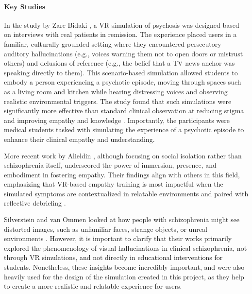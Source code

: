 \paragraph{Key Studies}

In the study by Zare-Bidaki \cite{Zare-Bidaki2022}, a VR simulation of psychosis was designed based on interviews with real patients in remission. The experience placed users in a familiar, culturally grounded setting where they encountered persecutory auditory hallucinations (e.g., voices warning them not to open doors or mistrust others) and delusions of reference (e.g., the belief that a TV news anchor was speaking directly to them). This scenario-based simulation allowed students to embody a person experiencing a psychotic episode, moving through spaces such as a living room and kitchen while hearing distressing voices and observing realistic environmental triggers. The study found that such simulations were significantly more effective than standard clinical observation at reducing stigma and improving empathy and knowledge \cite{Zare-Bidaki2022}. Importantly, the participants were medical students tasked with simulating the experience of a psychotic episode to enhance their clinical empathy and understanding.

\vspace{1em}

More recent work by Alieldin \cite{Alieldin2024}, although focusing on social isolation rather than schizophrenia itself, underscored the power of immersion, presence, and embodiment in fostering empathy. Their findings align with others in this field, emphasizing that VR-based empathy training is most impactful when the simulated symptoms are contextualized in relatable environments and paired with reflective debriefing \cite{Alieldin2024}.

\vspace{1em}

Silverstein \cite{Silverstein2021} and van Ommen \cite{Vanommen2019} looked at how people with schizophrenia might see distorted images, such as unfamiliar faces, strange objects, or unreal environments \cite{Silverstein2021,Vanommen2019}. However, it is important to clarify that their works primarily explored the phenomenology of visual hallucinations in clinical schizophrenia, not through VR simulations, and not directly in educational interventions for students. Nonetheless, these insights become incredibly important, and were also heavily used for the design of the simulation created in this project, as they help to create a more realistic and relatable experience for users.

